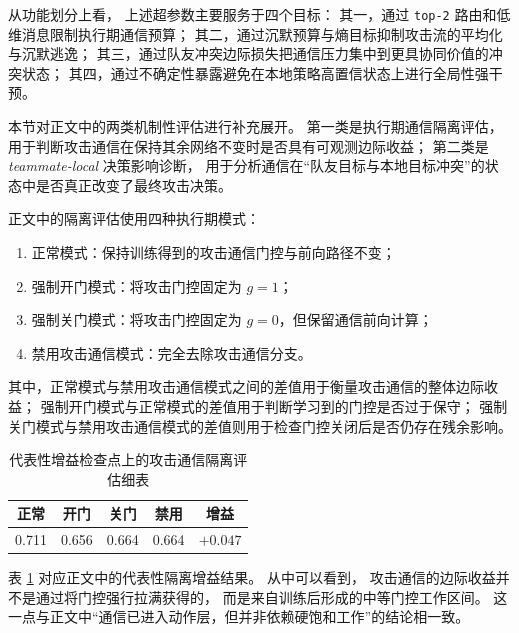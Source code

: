 从功能划分上看，
上述超参数主要服务于四个目标：
其一，通过 \texttt{top-2} 路由和低维消息限制执行期通信预算；
其二，通过沉默预算与熵目标抑制攻击流的平均化与沉默逃逸；
其三，通过队友冲突边际损失把通信压力集中到更具协同价值的冲突状态；
其四，通过不确定性暴露避免在本地策略高置信状态上进行全局性强干预。


本节对正文中的两类机制性评估进行补充展开。
第一类是执行期通信隔离评估，
用于判断攻击通信在保持其余网络不变时是否具有可观测边际收益；
第二类是 \textit{teammate-local} 决策影响诊断，
用于分析通信在“队友目标与本地目标冲突”的状态中是否真正改变了最终攻击决策。


正文中的隔离评估使用四种执行期模式：
\begin{enumerate}
    \item 正常模式：保持训练得到的攻击通信门控与前向路径不变；
    \item 强制开门模式：将攻击门控固定为 $g=1$；
    \item 强制关门模式：将攻击门控固定为 $g=0$，但保留通信前向计算；
    \item 禁用攻击通信模式：完全去除攻击通信分支。
\end{enumerate}

其中，正常模式与禁用攻击通信模式之间的差值用于衡量攻击通信的整体边际收益；
强制开门模式与正常模式的差值用于判断学习到的门控是否过于保守；
强制关门模式与禁用攻击通信模式的差值则用于检查门控关闭后是否仍存在残余影响。

\begin{table}[htbp]
    \centering
    \caption{代表性增益检查点上的攻击通信隔离评估细表}
    \label{tab:appendix_isolation_detail}
    {\renewcommand{\arraystretch}{1.28}
    \setlength{\extrarowheight}{1pt}
    \setlength{\tabcolsep}{7pt}
    \begin{tabular}{ccccc}
        \toprule
        正常 & 开门 & 关门 & 禁用 & 增益 \\
        \midrule
        0.711 & 0.656 & 0.664 & 0.664 & $+0.047$ \\
        \bottomrule
    \end{tabular}}
\end{table}

表 \ref{tab:appendix_isolation_detail} 对应正文中的代表性隔离增益结果。
从中可以看到，
攻击通信的边际收益并不是通过将门控强行拉满获得的，
而是来自训练后形成的中等门控工作区间。
这一点与正文中“通信已进入动作层，但并非依赖硬饱和工作”的结论相一致。

